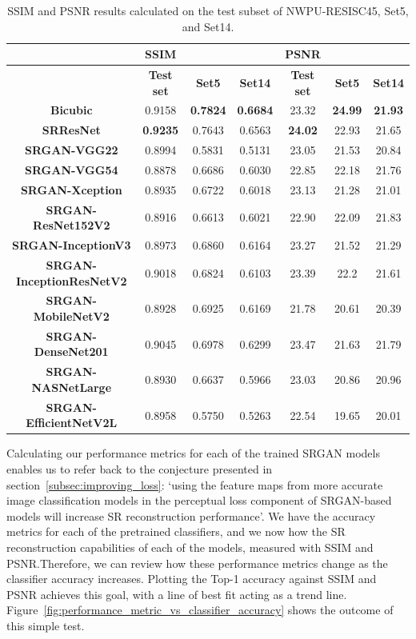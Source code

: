 \begin{table}
    \centering
    \begin{tabular}{ccccccc}
        \toprule
        {} & \textbf{SSIM} & {} & {} & \textbf{PSNR}  & {} & {} \\
        \midrule
        {} & \textbf{Test set} & \textbf{Set5} & \textbf{Set14} & \textbf{Test set} & \textbf{Set5} & \textbf{Set14} \\
        \midrule
        \textbf{Bicubic} & 0.9158 & \textbf{0.7824} & \textbf{0.6684} & 23.32 & \textbf{24.99} & \textbf{21.93} \\
        \textbf{SRResNet} & \textbf{0.9235} & 0.7643 & 0.6563 & \textbf{24.02} & 22.93 & 21.65 \\
        \textbf{SRGAN-VGG22} & 0.8994 & 0.5831 & 0.5131 & 23.05 & 21.53 & 20.84 \\
        \textbf{SRGAN-VGG54} & 0.8878 & 0.6686 & 0.6030 & 22.85 & 22.18 & 21.76 \\ 
        \textbf{SRGAN-Xception} & 0.8935 & 0.6722 & 0.6018 & 23.13 & 21.28 & 21.01 \\  
        \textbf{SRGAN-ResNet152V2} & 0.8916 & 0.6613 & 0.6021 & 22.90 & 22.09 & 21.83 \\ 
        \textbf{SRGAN-InceptionV3} & 0.8973 & 0.6860 & 0.6164 & 23.27 & 21.52 & 21.29 \\ 
        \textbf{SRGAN-InceptionResNetV2} & 0.9018 & 0.6824 & 0.6103 & 23.39 & 22.2 & 21.61 \\ 
        \textbf{SRGAN-MobileNetV2} & 0.8928 & 0.6925 & 0.6169 & 21.78 & 20.61 & 20.39 \\ 
        \textbf{SRGAN-DenseNet201} & 0.9045 & 0.6978 & 0.6299 & 23.47 & 21.63 & 21.79 \\
        \textbf{SRGAN-NASNetLarge} & 0.8930 & 0.6637 & 0.5966 & 23.03 & 20.86 & 20.96 \\
        \textbf{SRGAN-EfficientNetV2L} & 0.8958 & 0.5750 & 0.5263 & 22.54 & 19.65 & 20.01 \\
        \bottomrule
    \end{tabular}
    \caption{SSIM and PSNR results calculated on the test subset of NWPU-RESISC45, Set5, and Set14.}
    \label{fig:performance_results}
\end{table}
Calculating our performance metrics for each of the trained SRGAN models enables us to refer back to the conjecture presented in section~\ref{subsec:improving_loss}: `using the feature maps from more accurate image classification models in the perceptual loss component of SRGAN-based models will increase SR reconstruction performance'. We have the accuracy metrics for each of the pretrained classifiers, and we now how the SR reconstruction capabilities of each of the models, measured with SSIM and PSNR.\@ Therefore, we can review how these performance metrics change as the classifier accuracy increases. Plotting the Top-1 accuracy against SSIM and PSNR achieves this goal, with a line of best fit acting as a trend line. Figure~\ref{fig:performance_metric_vs_classifier_accuracy} shows the outcome of this simple test.
